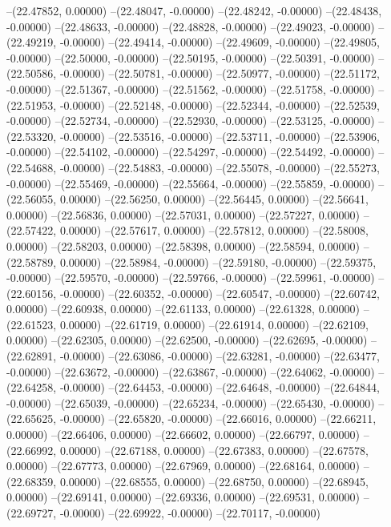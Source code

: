 --(22.47852, 0.00000)
--(22.48047, -0.00000)
--(22.48242, -0.00000)
--(22.48438, -0.00000)
--(22.48633, -0.00000)
--(22.48828, -0.00000)
--(22.49023, -0.00000)
--(22.49219, -0.00000)
--(22.49414, -0.00000)
--(22.49609, -0.00000)
--(22.49805, -0.00000)
--(22.50000, -0.00000)
--(22.50195, -0.00000)
--(22.50391, -0.00000)
--(22.50586, -0.00000)
--(22.50781, -0.00000)
--(22.50977, -0.00000)
--(22.51172, -0.00000)
--(22.51367, -0.00000)
--(22.51562, -0.00000)
--(22.51758, -0.00000)
--(22.51953, -0.00000)
--(22.52148, -0.00000)
--(22.52344, -0.00000)
--(22.52539, -0.00000)
--(22.52734, -0.00000)
--(22.52930, -0.00000)
--(22.53125, -0.00000)
--(22.53320, -0.00000)
--(22.53516, -0.00000)
--(22.53711, -0.00000)
--(22.53906, -0.00000)
--(22.54102, -0.00000)
--(22.54297, -0.00000)
--(22.54492, -0.00000)
--(22.54688, -0.00000)
--(22.54883, -0.00000)
--(22.55078, -0.00000)
--(22.55273, -0.00000)
--(22.55469, -0.00000)
--(22.55664, -0.00000)
--(22.55859, -0.00000)
--(22.56055, 0.00000)
--(22.56250, 0.00000)
--(22.56445, 0.00000)
--(22.56641, 0.00000)
--(22.56836, 0.00000)
--(22.57031, 0.00000)
--(22.57227, 0.00000)
--(22.57422, 0.00000)
--(22.57617, 0.00000)
--(22.57812, 0.00000)
--(22.58008, 0.00000)
--(22.58203, 0.00000)
--(22.58398, 0.00000)
--(22.58594, 0.00000)
--(22.58789, 0.00000)
--(22.58984, -0.00000)
--(22.59180, -0.00000)
--(22.59375, -0.00000)
--(22.59570, -0.00000)
--(22.59766, -0.00000)
--(22.59961, -0.00000)
--(22.60156, -0.00000)
--(22.60352, -0.00000)
--(22.60547, -0.00000)
--(22.60742, 0.00000)
--(22.60938, 0.00000)
--(22.61133, 0.00000)
--(22.61328, 0.00000)
--(22.61523, 0.00000)
--(22.61719, 0.00000)
--(22.61914, 0.00000)
--(22.62109, 0.00000)
--(22.62305, 0.00000)
--(22.62500, -0.00000)
--(22.62695, -0.00000)
--(22.62891, -0.00000)
--(22.63086, -0.00000)
--(22.63281, -0.00000)
--(22.63477, -0.00000)
--(22.63672, -0.00000)
--(22.63867, -0.00000)
--(22.64062, -0.00000)
--(22.64258, -0.00000)
--(22.64453, -0.00000)
--(22.64648, -0.00000)
--(22.64844, -0.00000)
--(22.65039, -0.00000)
--(22.65234, -0.00000)
--(22.65430, -0.00000)
--(22.65625, -0.00000)
--(22.65820, -0.00000)
--(22.66016, 0.00000)
--(22.66211, 0.00000)
--(22.66406, 0.00000)
--(22.66602, 0.00000)
--(22.66797, 0.00000)
--(22.66992, 0.00000)
--(22.67188, 0.00000)
--(22.67383, 0.00000)
--(22.67578, 0.00000)
--(22.67773, 0.00000)
--(22.67969, 0.00000)
--(22.68164, 0.00000)
--(22.68359, 0.00000)
--(22.68555, 0.00000)
--(22.68750, 0.00000)
--(22.68945, 0.00000)
--(22.69141, 0.00000)
--(22.69336, 0.00000)
--(22.69531, 0.00000)
--(22.69727, -0.00000)
--(22.69922, -0.00000)
--(22.70117, -0.00000)
